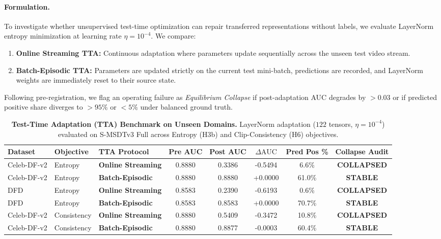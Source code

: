 \paragraph{Formulation.}
To investigate whether unsupervised test-time optimization can repair transferred representations without labels, we evaluate LayerNorm entropy minimization \citep{wang2021tent} at learning rate $\eta = 10^{-4}$. We compare:
\begin{enumerate}[leftmargin=*]
    \item \textbf{Online Streaming TTA:} Continuous adaptation where parameters update sequentially across the unseen test video stream.
    \item \textbf{Batch-Episodic TTA:} Parameters are updated strictly on the current test mini-batch, predictions are recorded, and LayerNorm weights are immediately reset to their source state.
\end{enumerate}
Following pre-registration, we flag an operating failure as \emph{Equilibrium Collapse} if post-adaptation AUC degrades by $> 0.03$ or if predicted positive share diverges to $>95\%$ or $<5\%$ under balanced ground truth.

\begin{table}[t]
\centering
\small
\caption{\textbf{Test-Time Adaptation (TTA) Benchmark on Unseen Domains.} LayerNorm adaptation ($122$ tensors, $\eta=10^{-4}$) evaluated on S-MSDTv3 Full across Entropy (H3b) and Clip-Consistency (H6) objectives.}
\label{tab:tta_benchmark}
\begin{tabular}{l l l c c c c c}
\toprule
\textbf{Dataset} & \textbf{Objective} & \textbf{TTA Protocol} & \textbf{Pre AUC} & \textbf{Post AUC} & \textbf{$\Delta\text{AUC}$} & \textbf{Pred Pos \%} & \textbf{Collapse Audit} \\
\midrule
Celeb-DF-v2 & Entropy & \textbf{Online Streaming}  & 0.8880 & 0.3386 & -0.5494 & 6.6\%  & \textbf{COLLAPSED} \\
Celeb-DF-v2 & Entropy & \textbf{Batch-Episodic}   & 0.8880 & 0.8880 & +0.0000 & 61.0\% & \textbf{STABLE} \\
DFD         & Entropy & \textbf{Online Streaming}  & 0.8583 & 0.2390 & -0.6193 & 0.6\%  & \textbf{COLLAPSED} \\
DFD         & Entropy & \textbf{Batch-Episodic}   & 0.8583 & 0.8583 & +0.0000 & 70.7\% & \textbf{STABLE} \\
\midrule
Celeb-DF-v2 & Consistency & \textbf{Online Streaming} & 0.8880 & 0.5409 & -0.3472 & 10.8\% & \textbf{COLLAPSED} \\
Celeb-DF-v2 & Consistency & \textbf{Batch-Episodic}  & 0.8880 & 0.8877 & -0.0003 & 60.4\% & \textbf{STABLE} \\
\bottomrule
\end{tabular}
\end{table}

